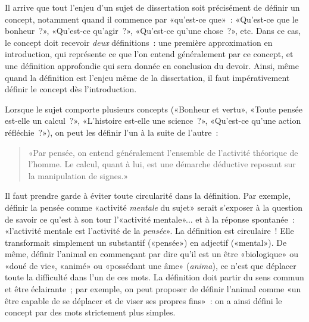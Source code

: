 \documentclass[a4paper,11pt]{article}
\begin{document}
\par

Il arrive que tout l'enjeu d'un sujet de dissertation soit précisément
de définir un concept, notamment quand il commence par «qu'est-ce que»~:
«Qu'est-ce que le bonheur~?», «Qu'est-ce qu'agir~?», «Qu'est-ce qu'une
chose~?», etc. Dans ce cas, le concept doit recevoir \emph{deux}
définitions~: une première approximation en introduction, qui représente
ce que l'on entend généralement par ce concept, et une définition
approfondie qui sera donnée en conclusion du devoir. Ainsi, même quand
la définition est l'enjeu même de la dissertation, il faut
impérativement définir le concept dès l'introduction. 

\par

Lorsque le sujet comporte plusieurs concepts («Bonheur et vertu», «Toute
pensée est-elle un calcul~?», «L'histoire est-elle une science~?»,
«Qu'est-ce qu'une action réfléchie~?»), on peut les définir l'un à la
suite de l'autre~:

\begin{quote}
  «Par pensée, on entend généralement l'ensemble de l'activité théorique
  de l'homme. Le calcul, quant à lui, est une démarche déductive
  reposant sur la manipulation de signes.»
\end{quote}

Il faut prendre garde à éviter toute circularité dans la définition. Par
exemple, définir la pensée comme «activité \emph{mentale} du sujet»
serait s'exposer à la question de savoir ce qu'est à son tour
l'«activité mentale»... et à la réponse spontanée~: «l'activité mentale
est l'activité de la \emph{pensée}». La définition est circulaire~! Elle
transformait simplement un substantif («pensée») en adjectif («mental»).
De même, définir l'animal en commençant par dire qu'il est un être
«biologique» ou «doué de vie», «animé» ou «possédant une âme»
(\emph{anima}), ce n'est que déplacer toute la difficulté dans l'un de
ces mots. La définition doit partir du sens commun et être éclairante~;
par exemple, on peut proposer de définir l'animal comme «un être capable
de se déplacer et de viser ses propres fins»~: on a ainsi défini le
concept par des mots strictement plus simples.

\par
\end{document}

